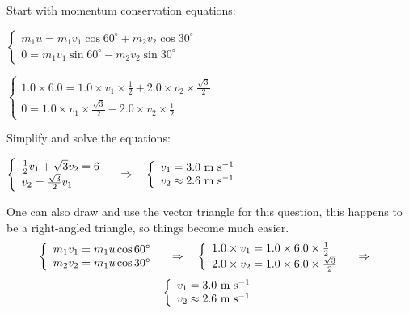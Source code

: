 
\begin{soln}Start with momentum conservation equations:

\eqskip$\left\{\begin{array}{l}
	m_1 u = m_1 v_1 \cos60^\circ + m_2 v_2 \cos30^\circ \\
	0 = m_1 v_1 \sin60^\circ - m_2 v_2 \sin30^\circ
	\end{array} \right. $

\eqskip $ \left\{\begin{array}{l}
	1.0\times6.0 = 1.0 \times v_1 \times \frac{1}{2} + 2.0 \times v_2 \times \frac{\sqrt{3}}{2}  \\
	0 = 1.0 \times v_1 \times \frac{\sqrt{3}}{2} - 2.0 \times v_2 \times \frac{1}{2}
	\end{array} \right. $

\eqyskip Simplify and solve the equations:

\eqskip $ \left\{\begin{array}{l}
\frac{1}{2} v_1 + \sqrt{3} v_2 = 6 \\
v_2 =  \frac{\sqrt{3}}{2} v_1
\end{array} \right. \quad \Rightarrow \quad 
\left\{\begin{array}{l}
v_1 = 3.0 \text{ m s$^{-1}$} \\
v_2 \approx 2.6 \text{ m s$^{-1}$}
\end{array} \right.$

\eqyskip One can also draw and use the vector triangle for this question, this happens to be a right-angled triangle, so things become much easier.
\begin{equation*}
	\left\{\begin{array}{l}
	m_1 v_1 = m_1 u \cos 60^\circ \\
	m_2 v_2 = m_1 u \cos 30^\circ
	\end{array} \right. \quad \Rightarrow \quad 
	\left\{\begin{array}{l}
	1.0\times v_1 = 1.0 \times 6.0 \times \frac{1}{2} \\
	2.0\times v_2 = 1.0 \times 6.0 \times \frac{\sqrt{3}}{2}
	\end{array} \right.	\quad \Rightarrow \quad 
\end{equation*}
\begin{equation*}
	\left\{\begin{array}{l}
	v_1 = 3.0 \text{ m s$^{-1}$} \\
	v_2 \approx 2.6 \text{ m s$^{-1}$}
	\end{array} \right.  
\end{equation*}
\end{soln}

